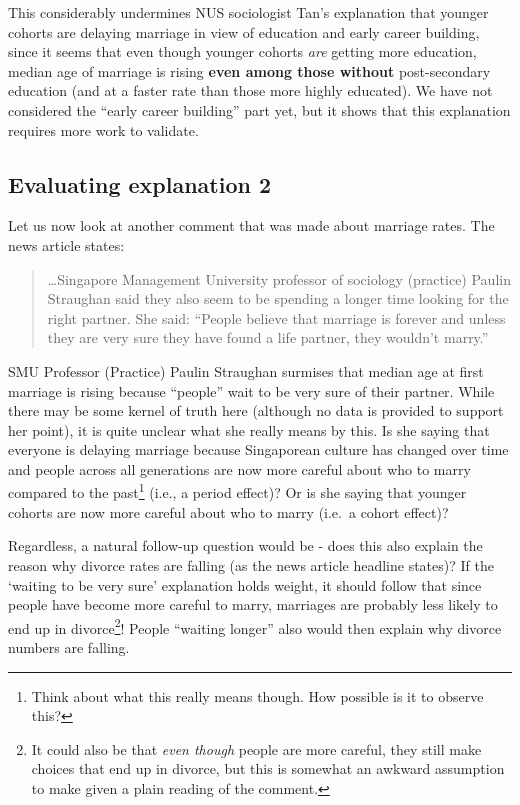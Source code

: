 \documentclass[
  openany]{book}
\begin{document}
This considerably undermines NUS sociologist Tan's explanation that younger cohorts are delaying marriage in view of education and early career building, since it seems that even though younger cohorts \emph{are} getting more education, median age of marriage is rising \textbf{even among those without} post-secondary education (and at a faster rate than those more highly educated). We have not considered the ``early career building'' part yet, but it shows that this explanation requires more work to validate.

\hypertarget{evaluating-explanation-2}{%
\subsection{Evaluating explanation 2}\label{evaluating-explanation-2}}

Let us now look at another comment that was made about marriage rates. The news article states:

\begin{quote}
\ldots Singapore Management University professor of sociology (practice) Paulin Straughan said they also seem to be spending a longer time looking for the right partner. She said: ``People believe that marriage is forever and unless they are very sure they have found a life partner, they wouldn't marry.''
\end{quote}

SMU Professor (Practice) Paulin Straughan surmises that median age at first marriage is rising because ``people'' wait to be very sure of their partner. While there may be some kernel of truth here (although no data is provided to support her point), it is quite unclear what she really means by this. Is she saying that everyone is delaying marriage because Singaporean culture has changed over time and people across all generations are now more careful about who to marry compared to the past\footnote{Think about what this really means though. How possible is it to observe this?} (i.e., a period effect)? Or is she saying that younger cohorts are now more careful about who to marry (i.e.~a cohort effect)?

Regardless, a natural follow-up question would be - does this also explain the reason why divorce rates are falling (as the news article headline states)? If the `waiting to be very sure' explanation holds weight, it should follow that since people have become more careful to marry, marriages are probably less likely to end up in divorce\footnote{It could also be that \emph{even though} people are more careful, they still make choices that end up in divorce, but this is somewhat an awkward assumption to make given a plain reading of the comment.}! People ``waiting longer'' also would then explain why divorce numbers are falling.
\end{document}
